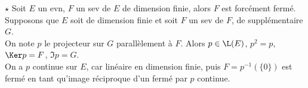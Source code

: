 \documentclass[11pt]{article}
\begin{document}
\begin{thm}{$\star$}{}
    Soit $E$ un evn, $F$ un sev de $E$ de dimension finie, alors $F$ est forcément fermé.
    \tcblower 
        Supposons que $E$ soit de dimension finie et soit $F$ un sev de $F$, de supplémentaire $G$.\\
        On note $p$ le projecteur sur $G$ parallèlement à $F$. Alors $p\in\L(E)$, $p^2=p$, $\Ker p = F$, $\Im p = G$.\\
        On a $p$ continue sur $E$, car linéaire en dimension finie, puis $F=p^{-1}(\{0\})$ est fermé en tant qu'image réciproque d'un fermé par $p$ continue.
\end{thm}
\end{document}
